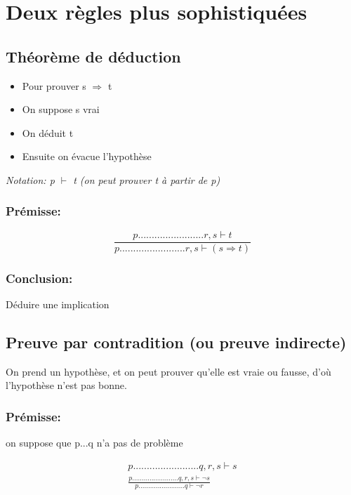 
\chapter{Deux règles plus sophistiquées}

\section{Théorème de déduction}

\begin{itemize}
\item  Pour prouver s $\Rightarrow$ t
\item  On suppose s vrai
\item  On déduit t
\item  Ensuite on évacue l'hypothèse
\end{itemize}


\textit{Notation: p $\vdash$ t (on peut prouver t à partir de p) }

\subsection{Prémisse:}

\begin{equation}
\frac{p........................r, s \vdash t} 
{p........................r, s \vdash (s \Rightarrow t)}
\end{equation}

\subsection{Conclusion:}

Déduire une implication

\section{Preuve par contradition (ou preuve indirecte)}

On prend un hypothèse, et on peut prouver qu'elle est vraie ou fausse, d'où l'hypothèse n'est pas bonne.

\subsection{Prémisse:} 
on suppose que p...q n'a pas de problème

\begin{equation}
\begin{split}
p........................q, r, s \vdash s \\
\frac{p........................ q,r, s \vdash \lnot s}
{p........................ q \vdash \lnot r}
\end{split}
\end{equation}

